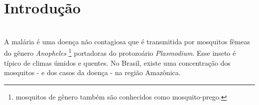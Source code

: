 \documentclass[
	12pt,				%
	openright,			%
	twoside,			%
	a4paper,			%
	english,			%
	french,				%
	spanish,			%
	brazil				%
	]{abntex2}
\begin{document}
\frenchspacing 


\imprimircapa

\imprimirfolhaderosto*


%
%     

\newpage

\tableofcontents*
\cleardoublepage



\textual

\chapter*[Introdução]{Introdução}

\\
A malária é uma doença não contagiosa que é transmitida por mosquitos fêmeas do gênero  \textit{Anopheles} \footnote{mosquitos de gênero também são conhecidos como mosquito-prego.} portadoras do protozoário \textit{Plasmodium}. Esse inseto é típico de climas úmidos e quentes. No Brasil, existe uma concentração dos mosquitos - e dos casos da doença -  na região Amazônica.
\end{document}
